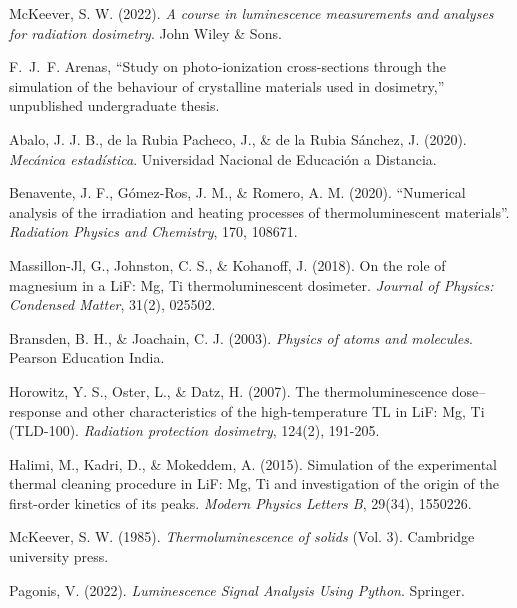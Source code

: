 
\begin{thebibliography}{999}

McKeever, S. W. (2022). \textit{A course in luminescence measurements and analyses for radiation dosimetry}. John Wiley \& Sons.

F.~J.~F. Arenas, ``Study on photo-ionization cross-sections through the simulation of the behaviour of crystalline materials used in dosimetry,'' unpublished undergraduate thesis.


Abalo, J. J. B., de la Rubia Pacheco, J., \& de la Rubia Sánchez, J. (2020). \textit{Mecánica estadística}. Universidad Nacional de Educación a Distancia.

Benavente, J. F., Gómez-Ros, J. M., \& Romero, A. M. (2020). ``Numerical analysis of the irradiation and heating processes of thermoluminescent materials''. \textit{Radiation Physics and Chemistry}, 170, 108671.

Massillon-Jl, G., Johnston, C. S., \& Kohanoff, J. (2018). On the role of magnesium in a LiF: Mg, Ti thermoluminescent dosimeter. \textit{Journal of Physics: Condensed Matter}, 31(2), 025502.

Bransden, B. H., \& Joachain, C. J. (2003). \textit{Physics of atoms and molecules}. Pearson Education India.

Horowitz, Y. S., Oster, L., \& Datz, H. (2007). The thermoluminescence dose–response and other characteristics of the high-temperature TL in LiF: Mg, Ti (TLD-100). \textit{Radiation protection dosimetry}, 124(2), 191-205.

Halimi, M., Kadri, D., \& Mokeddem, A. (2015). Simulation of the experimental thermal cleaning procedure in LiF: Mg, Ti and investigation of the origin of the first-order kinetics of its peaks. \textit{Modern Physics Letters B}, 29(34), 1550226.

McKeever, S. W. (1985). \textit{Thermoluminescence of solids} (Vol. 3). Cambridge university press.

Pagonis, V. (2022). \textit{Luminescence Signal Analysis Using Python}. Springer.



\end{thebibliography}